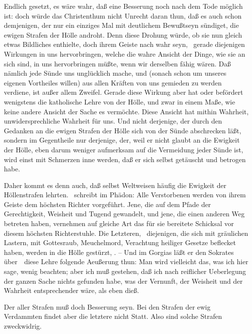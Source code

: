 \begin{aufza}
\begin{aufzb}
\begin{aufzc}
\item Endlich gesetzt, es wäre wahr, daß eine Besserung noch nach dem Tode möglich ist: doch würde das Christenthum nicht Unrecht daran thun, daß es auch schon demjenigen, der nur ein einziges Mal mit deutlichem Bewußtseyn sündiget, die ewigen Strafen der Hölle androht. Denn diese Drohung würde, ob sie nun gleich etwas Bildliches enthielte, doch ihrem Geiste nach wahr seyn, \dh\ gerade diejenigen Wirkungen in uns hervorbringen, welche die wahre Ansicht der Dinge, wie sie an sich sind, in uns hervorbringen müßte, wenn wir derselben fähig wären. Daß nämlich jede Sünde uns unglücklich mache, und (sonach schon um unseres eigenen Vortheiles willen) aus allen Kräften von uns gemieden zu werden verdiene, ist außer allem Zweifel. Gerade diese Wirkung aber hat oder befördert wenigstens die katholische Lehre von der Hölle, und zwar in einem Maße, wie keine andere Ansicht der Sache es vermöchte. Diese Ansicht hat mithin Wahrheit, unwidersprechliche Wahrheit für uns. Und nicht derjenige, der durch den Gedanken an die ewigen Strafen der Hölle sich von der Sünde abschrecken läßt, sondern im Gegentheile nur derjenige, der, weil er nicht glaubt an die Ewigkeit der Hölle, eben darum weniger aufmerksam auf die Vermeidung jeder Sünde ist, wird einst mit Schmerzen inne werden, daß er sich selbst getäuscht und betrogen habe.
\end{aufzc}
\begin{RWanm} 
Daher kommt es denn auch, daß selbst  Weltweisen häufig die Ewigkeit der Höllenstrafen lehrten.  \zB\ schreibt im Phädon: Alle Verstorbenen werden von ihrem Geiste dem höchsten Richter vorgeführt. Jene, die auf dem Pfade der Gerechtigkeit, Weisheit und Tugend gewandelt, und jene, die einen anderen Weg betreten haben, vernehmen auf gleiche Art das für sie bereitete Schicksal vor diesem höchsten Richterstuhle. Die Letzteren, \dh\ diejenigen, die sich mit gräulichen Lastern, mit Gottesraub, Meuchelmord, Verachtung heiliger Gesetze beflecket haben, werden in die Hölle gestürzt, . -- Und im Gorgias läßt er den Sokrates über~\ diese Lehre folgende Aeußerung thun: Man wird vielleicht das, was ich hier sage, wenig beachten; aber ich muß gestehen, daß ich nach reiflicher Ueberlegung der ganzen Sache nichts gefunden habe, was der Vernunft, der Weisheit und der Wahrheit entsprechender wäre, als eben dieß. \end{RWanm}
\begin{aufzc}
\item {} Der  aller Strafen muß doch Besserung seyn. Bei den Strafen der ewig Verdammten findet aber die letztere nicht Statt. Also sind solche Strafen zweckwidrig.\par

\end{aufzc}
\end{aufzb}
\end{aufza}
